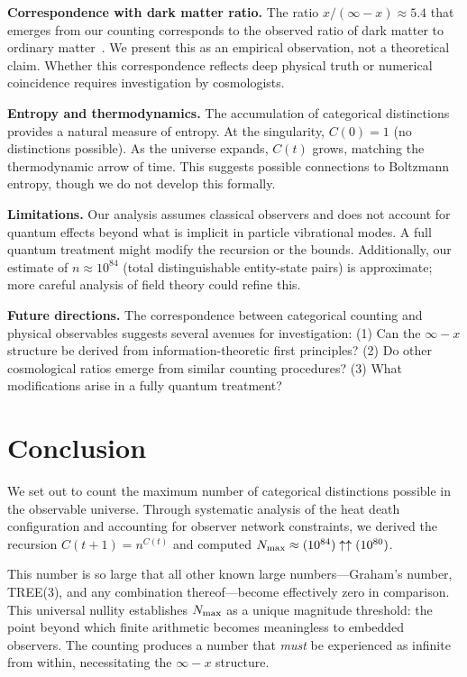 \textbf{Correspondence with dark matter ratio.} The ratio $x/(\infty - x) \approx 5.4$ that emerges from our counting corresponds to the observed ratio of dark matter to ordinary matter~\cite{PlanckCollaboration2018}. We present this as an empirical observation, not a theoretical claim. Whether this correspondence reflects deep physical truth or numerical coincidence requires investigation by cosmologists.

\textbf{Entropy and thermodynamics.} The accumulation of categorical distinctions provides a natural measure of entropy. At the singularity, $C(0) = 1$ (no distinctions possible). As the universe expands, $C(t)$ grows, matching the thermodynamic arrow of time. This suggests possible connections to Boltzmann entropy, though we do not develop this formally.

\textbf{Limitations.} Our analysis assumes classical observers and does not account for quantum effects beyond what is implicit in particle vibrational modes. A full quantum treatment might modify the recursion or the bounds. Additionally, our estimate of $n \approx 10^{84}$ (total distinguishable entity-state pairs) is approximate; more careful analysis of field theory could refine this.

\textbf{Future directions.} The correspondence between categorical counting and physical observables suggests several avenues for investigation: (1) Can the $\infty - x$ structure be derived from information-theoretic first principles? (2) Do other cosmological ratios emerge from similar counting procedures? (3) What modifications arise in a fully quantum treatment?

\section{Conclusion}

We set out to count the maximum number of categorical distinctions possible in the observable universe. Through systematic analysis of the heat death configuration and accounting for observer network constraints, we derived the recursion $C(t+1) = n^{C(t)}$ and computed $N_{\text{max}} \approx (10^{84}) \uparrow\uparrow (10^{80})$.

This number is so large that all other known large numbers—Graham's number, TREE(3), and any combination thereof—become effectively zero in comparison. This universal nullity establishes $N_{\text{max}}$ as a unique magnitude threshold: the point beyond which finite arithmetic becomes meaningless to embedded observers. The counting produces a number that \emph{must} be experienced as infinite from within, necessitating the $\infty - x$ structure.

